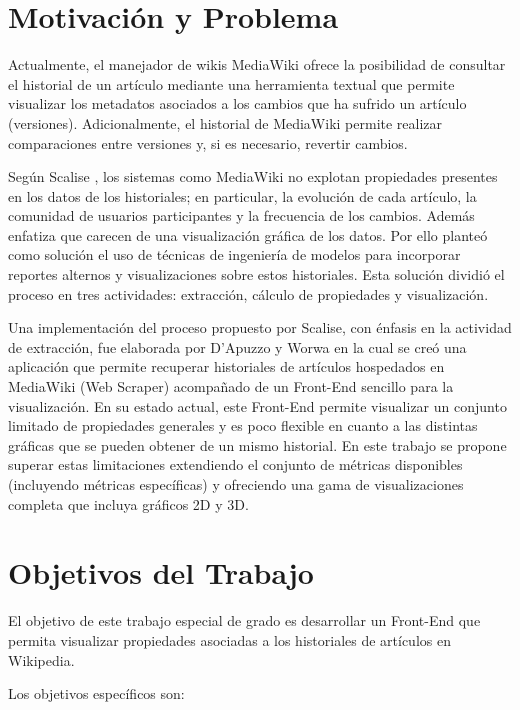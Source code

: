 \section{Motivación y Problema}

Actualmente, el manejador de wikis MediaWiki ofrece la posibilidad de consultar el historial de un artículo mediante una herramienta textual que permite visualizar los metadatos asociados a los cambios que ha sufrido un artículo (versiones). Adicionalmente, el historial de MediaWiki permite realizar comparaciones entre versiones y, si es necesario, revertir cambios.

Según Scalise \cite{Sca08}, los sistemas como MediaWiki no explotan propiedades presentes en los datos de los historiales; en particular, la evolución de cada artículo, la comunidad de usuarios participantes y la frecuencia de los cambios. Además enfatiza que carecen de una visualización gráfica de los datos. Por ello planteó como solución el uso de técnicas de ingeniería de modelos para incorporar reportes alternos y visualizaciones sobre estos historiales. Esta solución dividió el proceso en tres actividades: extracción, cálculo de propiedades y visualización.

Una implementación del proceso propuesto por Scalise, con énfasis en la actividad de extracción, fue elaborada por D'Apuzzo y Worwa \cite{Dap12} en la cual se creó una aplicación que permite recuperar historiales de artículos hospedados en MediaWiki (Web Scraper) acompañado de un Front-End sencillo para la visualización. En su estado actual, este Front-End permite visualizar un conjunto limitado de propiedades generales y es poco flexible en cuanto a las distintas gráficas que se pueden obtener de un mismo historial.
En este trabajo se propone superar estas limitaciones extendiendo el conjunto de métricas disponibles (incluyendo métricas específicas) y ofreciendo una gama de visualizaciones completa que incluya gráficos 2D y 3D.

\section{Objetivos del Trabajo}

El objetivo de este trabajo especial de grado es desarrollar un Front-End que permita visualizar propiedades asociadas a los historiales de artículos en Wikipedia.

Los objetivos específicos son:

